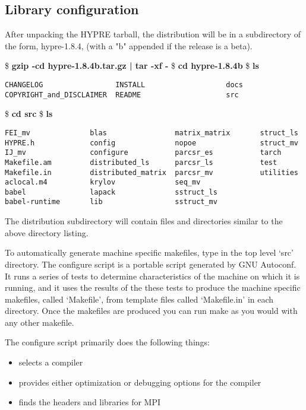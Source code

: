 \subsection{Library configuration}
After unpacking the HYPRE tarball, the distribution will be in a 
subdirectory of the form, hypre-1.8.4, (with a
"b" appended if the release is a beta).
\begin{ttfamily}
\begin{mdseries}
\linebreak
\$ \textbf{gzip -cd hypre-1.8.4b.tar.gz | tar -xf -}\linebreak
\$ \textbf{cd hypre-1.8.4b}\linebreak
\$ \textbf{ls}\linebreak
\begin{verbatim}
CHANGELOG                 INSTALL                   docs
COPYRIGHT_and_DISCLAIMER  README                    src
\end{verbatim}
\$ \textbf{cd src}\linebreak
\$ \textbf{ls}\linebreak
\begin{verbatim}
FEI_mv              blas                matrix_matrix       struct_ls
HYPRE.h             config              nopoe               struct_mv
IJ_mv               configure           parcsr_es           tarch
Makefile.am         distributed_ls      parcsr_ls           test
Makefile.in         distributed_matrix  parcsr_mv           utilities
aclocal.m4          krylov              seq_mv
babel               lapack              sstruct_ls
babel-runtime       lib                 sstruct_mv
\end{verbatim}
\end{mdseries}
\end{ttfamily}

The \hypre{} distribution subdirectory will contain files and directories 
similar to the above directory listing.

To automatically generate machine specific makefiles, type
 in the top level `src' directory.  The configure
script is a portable script generated by GNU Autoconf.  It runs a
series of tests to determine characteristics of the machine on which
it is running, and it uses the results of the these tests to produce
the machine specific makefiles, called `Makefile', from template files
called `Makefile.in' in each directory.  Once the makefiles are
produced you can run make as you would with any other makefile.

The configure script primarily does the following things:
\begin{itemize}
\item selects a compiler
\item provides either optimization or debugging options for the compiler
\item finds the headers and libraries for MPI
\end{itemize}

